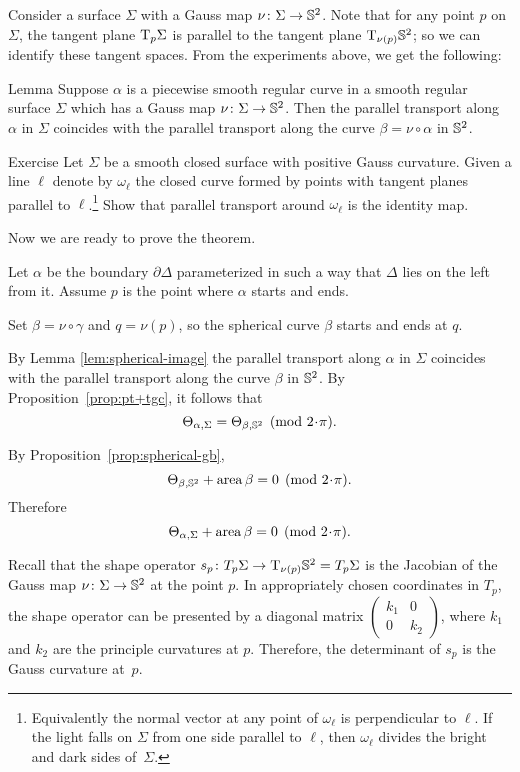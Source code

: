 Consider a surface $\Sigma$ with a Gauss map $\nu\colon\Sigma\to \mathbb{S}^2$.
Note that for any point $p$ on $\Sigma$, the tangent plane $\mathrm{T}_p\Sigma$ is parallel to the tangent plane $\mathrm{T}_{\nu(p)}\mathbb{S}^2$; so we can identify these tangent spaces.
From the experiments above, we get the following:

\begin{thm}{Lemma}\label{lem:spherical-image}
Suppose $\alpha$ is a piecewise smooth regular curve in a smooth regular surface $\Sigma$ which has a Gauss map $\nu\colon\Sigma\to \mathbb{S}^2$.
Then the parallel transport along $\alpha$ in $\Sigma$ coincides with the parallel transport along the curve $\beta=\nu\circ\alpha$ in $\mathbb{S}^2$.
\end{thm}

\begin{thm}{Exercise}
Let $\Sigma$ be a smooth closed surface with positive Gauss curvature.
Given a line $\ell$ denote by $\omega_\ell$ the closed curve formed by points with tangent planes parallel to $\ell$.\footnote{Equivalently the normal vector at any point of $\omega_\ell$ is perpendicular to $\ell$. If the light falls on $\Sigma$ from one side parallel to $\ell$, then $\omega_\ell$ divides the bright and dark sides of~$\Sigma$.}
Show that parallel transport around $\omega_\ell$ is the identity map.
\end{thm}

Now we are ready to prove the theorem.

Let $\alpha$ be the boundary $\partial\Delta$ parameterized in such a way that $\Delta$ lies on the left from it.
Assume $p$ is the point where $\alpha$ starts and ends.

Set $\beta=\nu\circ\gamma$ and $q=\nu(p)$, so the spherical curve $\beta$ starts and ends at $q$.

By Lemma \ref{lem:spherical-image} the parallel transport along $\alpha$ in $\Sigma$ coincides with the parallel transport along the curve $\beta$ in $\mathbb{S}^2$.
By Proposition~\ref{prop:pt+tgc}, it follows that 
\[\tgc{\alpha,\Sigma}=\tgc{\beta,\SS^2} \pmod{2\cdot \pi}.\]

By Proposition~\ref{prop:spherical-gb},
\[\tgc{\beta,\SS^2}+\area\beta=0\pmod{2\cdot \pi}.\]
Therefore 
\[\tgc{\alpha,\Sigma}+\area\beta=0\pmod{2\cdot \pi}.\]

Recall that the shape  operator $s_p\colon T_p\Sigma \to \mathrm{T}_{\nu(p)}\mathbb{S}^2=T_p\Sigma$ is the Jacobian of the Gauss map $\nu\colon\Sigma\to \mathbb{S}^2$ at the point $p$.
In appropriately chosen coordinates in $T_p$, the shape operator can be presented by a diagonal matrix 
$\left(\begin{smallmatrix}
k_1&0
\\
0&k_2
\end{smallmatrix}\right)$, where $k_1$ and $k_2$ are the principle curvatures at $p$.
Therefore, the determinant of $s_p$ is the Gauss curvature at~$p$.

